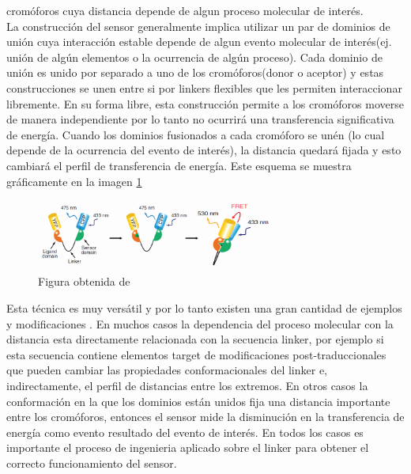\begin{itemize}
cromóforos cuya distancia depende de algun proceso molecular de interés. \\
La construcción del sensor generalmente implica utilizar un par de dominios de unión cuya interacción estable depende de algun evento molecular de interés(ej. unión de algún elementos o la ocurrencia de algún proceso).
Cada dominio de unión es unido por separado a uno de los cromóforos(donor o aceptor) y estas construcciones se unen entre si por linkers flexibles que les permiten interaccionar libremente.
En su forma libre, esta construcción permite a los cromóforos moverse de manera independiente por lo tanto no ocurrirá una transferencia significativa de energía. 
Cuando los dominios fusionados a cada cromóforo se unén (lo cual depende de la ocurrencia del evento de interés), la distancia quedará fijada y esto cambiará el perfil de transferencia de energía.
Este esquema se muestra gráficamente en la imagen \ref{fretSensor}

\begin{figure}[htbp]
\centering
\includegraphics[width=0.7\textwidth]{img/fret.png} 
\caption{Figura obtenida de \cite{crone2013gfp}}
\label{fretSensor}
\end{figure}

Esta técnica es muy versátil y por lo tanto existen una gran cantidad de ejemplos y modificaciones \cite{vinkenborg2009genetically,qiao2006zinc}. %
En muchos casos la dependencia del proceso molecular con la distancia esta directamente relacionada con la secuencia linker, 
por ejemplo si esta secuencia contiene elementos target de modificaciones post-traduccionales que pueden cambiar las propiedades conformacionales del linker e, indirectamente, el perfil de distancias entre los extremos. 
En otros casos la conformación en la que los dominios están unidos fija una distancia importante entre los cromóforos, entonces el sensor mide la disminución en la transferencia de energía como evento resultado del evento de interés.
En todos los casos es importante el proceso de ingenieria aplicado sobre el linker para obtener el correcto funcionamiento del sensor.




\end{itemize}
